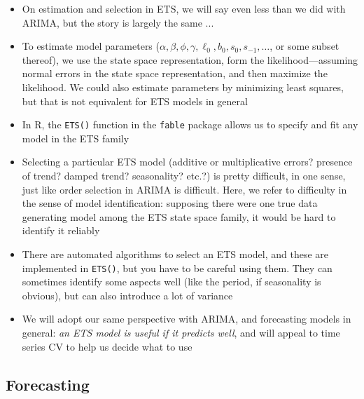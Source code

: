 \documentclass{article}
\begin{document}
\begin{itemize}
\item On estimation and selection in ETS, we will say even less than we did with
  ARIMA, but the story is largely the same ...

\item To estimate model parameters
  ($\alpha,\beta,\phi,\gamma,\ell_0,b_0,s_0,s_{-1},\dots$, or some subset
  thereof), we use the state space representation, form the
  likelihood---assuming normal errors in the state space representation, and
  then maximize the likelihood. We could also estimate parameters by minimizing
  least squares, but that is not equivalent for ETS models in general 

\item In R, the \verb|ETS()| function in the \verb|fable| package allows us to
  specify and fit any model in the ETS family

\item Selecting a particular ETS model (additive or multiplicative errors?
  presence of trend? damped trend? seasonality? etc.?) is pretty difficult, in
  one sense, just like order selection in ARIMA is difficult. Here, we refer to
  difficulty in the sense of model identification: supposing there were one true
  data generating model among the ETS state space family, it would be hard to
  identify it reliably 

\item There are automated algorithms to select an ETS model, and these are
  implemented in \verb|ETS()|, but you have to be careful using them. They can
  sometimes identify some aspects well (like the period, if seasonality is
  obvious), but can also introduce a lot of variance 

\item We will adopt our same perspective with ARIMA, and forecasting models in
  general: \emph{an ETS model is useful if it predicts well}, and will appeal to
  time series CV to help us decide what to use 
\end{itemize}

\subsection{Forecasting}
\end{document}
